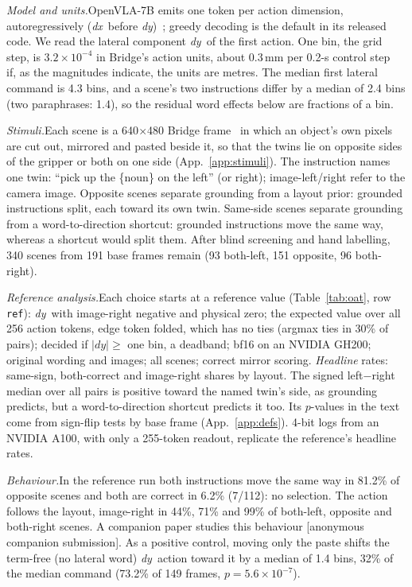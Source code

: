 \documentclass[conference]{IEEEtran}
\newcommand{\dy}{\textit{dy}}
\newcommand{\dx}{\textit{dx}}
\newcommand{\rowid}[1]{\texttt{#1}}
\newcommand{\head}[1]{\textit{#1}\hspace{0.4em}}
\newcommand{\anon}{[anonymous companion submission]}
\begin{document}
\head{Model and units.}OpenVLA-7B emits one token per action dimension, autoregressively (\dx\ before \dy)~\cite{kim2025finetuning}; greedy decoding is the default in its released code. We read the lateral component \dy\ of the first action. One bin, the grid step, is $3.2\times10^{-4}$ in Bridge's action units, about 0.3\,mm per 0.2-s control step~\cite{walke2023bridgedata} if, as the magnitudes indicate, the units are metres. The median first lateral command is 4.3 bins, and a scene's two instructions differ by a median of 2.4 bins (two paraphrases: 1.4), so the residual word effects below are fractions of a bin.

\head{Stimuli.}Each scene is a 640$\times$480 Bridge frame~\cite{oneill2024open} in which an object's own pixels are cut out, mirrored and pasted beside it, so that the twins lie on opposite sides of the gripper or both on one side (App.~\ref{app:stimuli}). The instruction names one twin: ``pick up the \{noun\} on the left'' (or right); image-left/right refer to the camera image. Opposite scenes separate grounding from a layout prior: grounded instructions split, each toward its own twin. Same-side scenes separate grounding from a word-to-direction shortcut: grounded instructions move the same way, whereas a shortcut would split them. After blind screening and hand labelling, 340 scenes from 191 base frames remain (93 both-left, 151 opposite, 96 both-right).

\head{Reference analysis.}Each choice starts at a reference value (Table~\ref{tab:oat}, row \rowid{ref}): \dy\ with image-right negative and physical zero; the expected value over all 256 action tokens, edge token folded, which has no ties (argmax ties in 30\% of pairs); decided if $|\dy|\geq$ one bin, a deadband; bf16 on an NVIDIA GH200; original wording and images; all scenes; correct mirror scoring. \emph{Headline} rates: same-sign, both-correct and image-right shares by layout. The signed left$-$right median over all pairs is positive toward the named twin's side, as grounding predicts, but a word-to-direction shortcut predicts it too. Its $p$-values in the text come from sign-flip tests by base frame (App.~\ref{app:defs}). 4-bit logs from an NVIDIA A100, with only a 255-token readout, replicate the reference's headline rates.

\head{Behaviour.}In the reference run both instructions move the same way in 81.2\% of opposite scenes and both are correct in 6.2\% (7/112): no selection. The action follows the layout, image-right in 44\%, 71\% and 99\% of both-left, opposite and both-right scenes. A companion paper studies this behaviour \anon. As a positive control, moving only the paste shifts the term-free (no lateral word) \dy\ action toward it by a median of 1.4 bins, 32\% of the median command (73.2\% of 149 frames, $p=5.6\times10^{-7}$).
\end{document}

